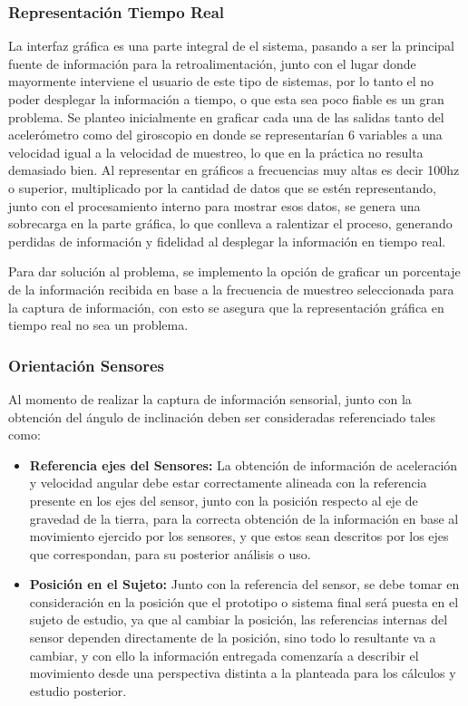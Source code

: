 \documentclass[12pt,a4paper]{article}
\begin{document}
			\subsubsection{Representación Tiempo Real}
			La interfaz gráfica es una parte integral de el sistema, pasando a ser la principal fuente de información para la retroalimentación, junto con el lugar donde mayormente interviene el usuario de este tipo de sistemas, por lo tanto el no poder desplegar la información a tiempo, o que esta sea poco fiable es un gran problema. Se planteo inicialmente en graficar cada una de las salidas tanto del acelerómetro como del giroscopio en donde se representarían 6 variables a una velocidad igual a la velocidad de muestreo, lo que en la práctica no resulta demasiado bien. Al representar en gráficos a frecuencias muy altas es decir 100hz o superior, multiplicado por la cantidad de datos que se estén representando, junto con el procesamiento interno para mostrar esos datos, se genera una sobrecarga en la parte gráfica, lo que conlleva a ralentizar el proceso, generando perdidas de información y fidelidad al desplegar la información en tiempo real.
			
			Para dar solución al problema, se implemento la opción de graficar un porcentaje de la información recibida en base a la frecuencia de muestreo seleccionada para la captura de información, con esto se asegura que la representación gráfica en tiempo real no sea un problema.
			
			\subsubsection{Orientación Sensores}
			Al momento de realizar la captura de información sensorial, junto con la obtención del ángulo de inclinación deben ser consideradas referenciado tales como:
			\begin{itemize}
				
				\item \textbf{Referencia ejes del Sensores:} La obtención de información de aceleración y velocidad angular debe estar correctamente alineada con la referencia presente en los ejes del sensor, junto con la posición respecto al eje de gravedad de la tierra, para la correcta obtención de la información en base al movimiento ejercido por los sensores, y que estos sean descritos por los ejes que correspondan, para su posterior análisis o uso.
				
				\item \textbf{Posición en el Sujeto:} Junto con la referencia del sensor, se debe tomar en consideración en la posición que el prototipo o sistema final será puesta en el sujeto de estudio, ya que al cambiar la posición, las referencias internas del sensor dependen directamente de la posición, sino todo lo resultante va a cambiar, y con ello la información entregada comenzaría a describir el movimiento desde una perspectiva distinta a la planteada para los cálculos y estudio posterior.
			\end{itemize}
			
\end{document}
